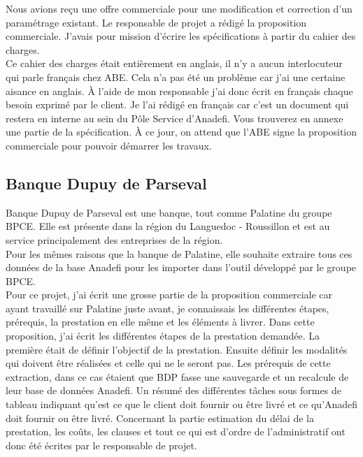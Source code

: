 Nous avions reçu une offre commerciale pour une modification et correction d'un paramétrage existant.
Le responsable de projet a rédigé la proposition commerciale. J'avais pour mission d'écrire les spécifications à partir du cahier des charges.\\

Ce cahier des charges était entièrement en anglais, il n'y a aucun interlocuteur qui parle français chez ABE. Cela n'a pas été un problème car j'ai une certaine aisance en anglais. À l'aide de mon responsable j'ai donc écrit en français chaque besoin exprimé par le client. Je l'ai rédigé en français car c'est un document qui restera en interne au sein du Pôle Service d'Anadefi. Vous trouverez en annexe une partie de la spécification. À ce jour, on attend que l'ABE signe la proposition commerciale pour pouvoir démarrer les travaux.



\subsection{Banque Dupuy de Parseval}

Banque Dupuy de Parseval est une banque, tout comme Palatine du groupe BPCE. Elle est présente dans la région du Languedoc - Roussillon et est au service principalement des entreprises de la région.\\

Pour les mêmes raisons que la banque de Palatine, elle souhaite extraire tous ces données de la base Anadefi pour les importer dans l'outil développé par le groupe BPCE.\\

Pour ce projet, j'ai écrit une grosse partie de la proposition commerciale car ayant travaillé sur Palatine juste avant, je connaissais les différentes étapes, prérequis, la prestation en elle même et les éléments à livrer. Dans cette proposition, j'ai écrit les différentes étapes de la prestation demandée.
La première était de définir l'objectif de la prestation. Ensuite définir les modalités qui doivent être réalisées et celle qui ne le seront pas. Les prérequis de cette extraction, dans ce cas étaient que BDP fasse une sauvegarde et un recalcule de leur base de données Anadefi. Un résumé des différentes tâches sous formes de tableau indiquant qu'est ce que le client doit fournir ou être livré et ce qu'Anadefi doit fournir ou être livré. Concernant la partie estimation du délai de la prestation, les coûts, les clauses et tout ce qui est d'ordre de l'administratif ont donc été écrites par le responsable de projet. \\

